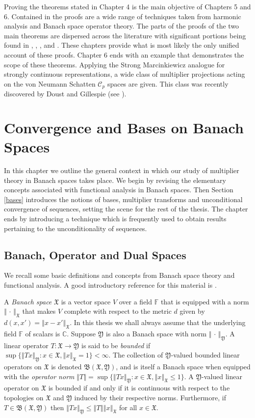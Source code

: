 \documentclass[mstat,12pt]{unswthesis}  %
\newcommand{\C}{\mathbb{C}}
\newcommand{\F}{\mathbb{F}}
\newcommand{\B}{\mathfrak{B}}
\newcommand{\X}{\mathfrak{X}}
\newcommand{\Y}{\mathfrak{Y}}
\newcommand{\CC}{\mathcal{C}}
\def\norm#1{\left \Vert #1 \right \Vert}
\numberwithin{equation}{section}
\begin{document}
Proving the theorems stated in Chapter 4 is the main objective of 
Chapters 5 and 6. Contained in the proofs are a wide range of techniques
taken from harmonic analysis and Banach space operator theory. 
The parts of the proofs of the two main theorems are dispersed across the 
literature with significant portions being found in
\cite{BBG}, \cite{BG Fourier}, \cite{BG Spectral}, \cite{BGM} and \cite{Bourg}.
These chapters provide what is most likely the only unified account of these
proofs. Chapter 6 ends
with an example that demonstrates the scope of these theorems. Applying the
Strong Marcinkiewicz analogue for strongly continuous representations, a wide
class of multiplier
projections acting on the von Neumann Schatten $\CC_p$ spaces are given. This
class was recently discovered by Doust and Gillespie (see \cite{DG}).



\chapter{Convergence and Bases on Banach Spaces}



In this chapter we outline the general context in which our study of multiplier
theory in Banach spaces
takes place. We begin by revising the elementary concepts
associated with functional analysis in Banach spaces. Then Section \ref{bases}
introduces the notions of bases, multiplier transforms and unconditional
convergence of sequences, setting the scene for the rest of the thesis. The 
chapter ends by introducing a technique which is frequently used to obtain 
results pertaining to the unconditionality of sequences.


\section{Banach, Operator and Dual Spaces}\label{Banach Spaces}

We recall some basic definitions and concepts from Banach space theory and
functional analysis. A good introductory reference for this material is 
\cite{Con}.

A {\em Banach space} $\X$ is a vector space $V$ over a field $\F$ that is 
equipped with a norm
$\norm{\,\cdot\,}_{\X}$ that makes $V$ complete with respect to the metric $d$
given by $d(x,x')=\norm{x-x'}_{\X}$. In this thesis we shall always assume that
the
underlying field $\F$ of scalars is $\C$. Suppose $\Y$ is also a Banach space
with norm $\norm{\,\cdot\,}_{\Y}$. A linear operator
$T:\X\rightarrow\Y$ is said to be {\em bounded} if
$\sup\{\norm{Tx}_{\Y}:x\in\X,\norm{x}_{\X}=1\}<\infty$. The collection of
$\Y$-valued bounded linear operators on $\X$ is denoted $\B(\X,\Y)$, and is
itself a Banach space when equipped with the {\em operator norm}
$\norm{T}=\sup\{\norm{Tx}_{\Y}:x\in\X,\norm{x}_{\X}\leq 1\}$. A $\Y$-valued
linear
operator on $\X$ is bounded if and only if it is continuous with respect to the
topologies on $\X$ and $\Y$ induced by their respective norms. Furthermore, if
$T\in\B(\X,\Y)$ then $\norm{Tx}_{\Y}\leq\norm{T}\norm{x}_{\X}$ for all $x\in\X$.
\end{document}

